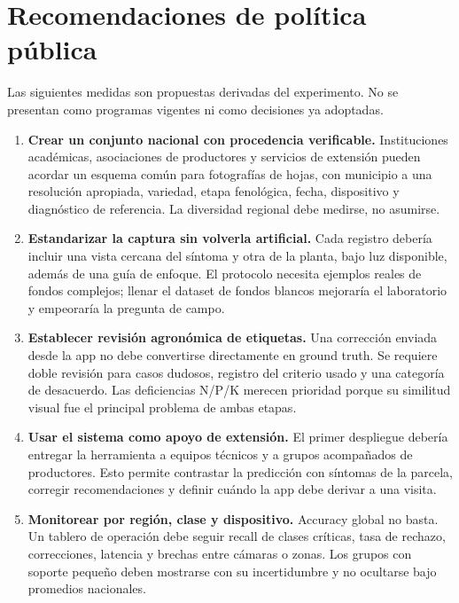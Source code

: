 \section{Recomendaciones de política pública}

Las siguientes medidas son propuestas derivadas del experimento. No se
presentan como programas vigentes ni como decisiones ya adoptadas.

\begin{enumerate}
  \item \textbf{Crear un conjunto nacional con procedencia verificable.}
  Instituciones académicas, asociaciones de productores y servicios de
  extensión pueden acordar un esquema común para fotografías de hojas, con
  municipio a una resolución apropiada, variedad, etapa fenológica, fecha,
  dispositivo y diagnóstico de referencia. La diversidad regional debe
  medirse, no asumirse.

  \item \textbf{Estandarizar la captura sin volverla artificial.}
  Cada registro debería incluir una vista cercana del síntoma y otra de la
  planta, bajo luz disponible, además de una guía de enfoque. El protocolo
  necesita ejemplos reales de fondos complejos; llenar el dataset de fondos
  blancos mejoraría el laboratorio y empeoraría la pregunta de campo.

  \item \textbf{Establecer revisión agronómica de etiquetas.}
  Una corrección enviada desde la app no debe convertirse directamente en
  ground truth. Se requiere doble revisión para casos dudosos, registro del
  criterio usado y una categoría de desacuerdo. Las deficiencias N/P/K merecen
  prioridad porque su similitud visual fue el principal problema de ambas
  etapas.

  \item \textbf{Usar el sistema como apoyo de extensión.}
  El primer despliegue debería entregar la herramienta a equipos técnicos y a
  grupos acompañados de productores. Esto permite contrastar la predicción con
  síntomas de la parcela, corregir recomendaciones y definir cuándo la app debe
  derivar a una visita.

  \item \textbf{Monitorear por región, clase y dispositivo.}
  Accuracy global no basta. Un tablero de operación debe seguir recall de
  clases críticas, tasa de rechazo, correcciones, latencia y brechas entre
  cámaras o zonas. Los grupos con soporte pequeño deben mostrarse con su
  incertidumbre y no ocultarse bajo promedios nacionales.


\end{enumerate}
